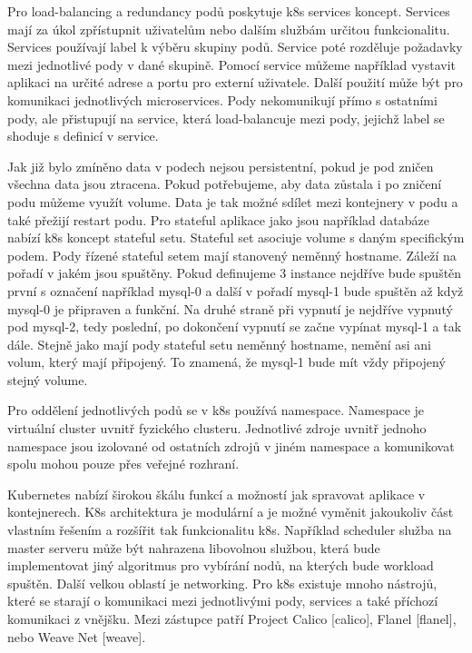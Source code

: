 Pro load-balancing a redundancy podů poskytuje k8s services koncept. Services mají za úkol zpřístupnit uživatelům nebo dalším službám určitou funkcionalitu. Services používají label k výběru skupiny podů. Service poté rozděluje požadavky mezi jednotlivé pody v dané skupině. Pomocí service můžeme například vystavit aplikaci na určité adrese a portu pro externí uživatele. Další použití může být pro komunikaci jednotlivých microservices. Pody nekomunikují přímo s ostatními pody, ale přistupují na service, která load-balancuje mezi pody, jejichž label se shoduje s definicí v service.\par
Jak již bylo zmíněno data v podech nejsou persistentní, pokud je pod zničen všechna data jsou ztracena. Pokud potřebujeme, aby data zůstala i po zničení podu můžeme využít volume. Data je tak možné sdílet mezi kontejnery v podu a také přežijí restart podu. Pro stateful aplikace jako jsou například databáze nabízí k8s koncept stateful setu. Stateful set asociuje volume s daným specifickým podem. Pody řízené stateful setem mají stanovený neměnný hostname. Záleží na pořadí v jakém jsou spuštěny. Pokud definujeme 3 instance nejdříve bude spuštěn první s označení například mysql-0 a další v pořadí mysql-1 bude spuštěn až když mysql-0 je připraven a funkční. Na druhé straně při vypnutí je nejdříve vypnutý pod mysql-2, tedy poslední, po dokončení vypnutí se začne vypínat mysql-1 a tak dále. Stejně jako mají pody stateful setu neměnný hostname, nemění asi ani volum, který mají připojený. To znamená, že mysql-1 bude mít vždy připojený stejný volume.\par
Pro oddělení jednotlivých podů se v k8s používá namespace. Namespace je virtuální cluster uvnitř fyzického clusteru. Jednotlivé zdroje uvnitř jednoho namespace jsou izolované od ostatních zdrojů v jiném namespace a komunikovat spolu mohou pouze přes veřejné rozhraní. \par
Kubernetes nabízí širokou škálu funkcí a možností jak spravovat aplikace v kontejnerech. K8s architektura je modulární a je možné vyměnit jakoukoliv část vlastním řešením a rozšířit tak funkcionalitu k8s. Například scheduler služba na master serveru může být nahrazena libovolnou službou, která bude implementovat jiný algoritmus pro vybírání nodů, na kterých bude workload spuštěn. Další velkou oblastí je networking. Pro k8s existuje mnoho nástrojů, které se starají o komunikaci mezi jednotlivými pody, services a také příchozí komunikaci z vnějšku. Mezi zástupce patří Project Calico [calico], Flanel [flanel], nebo Weave Net [weave]. 

